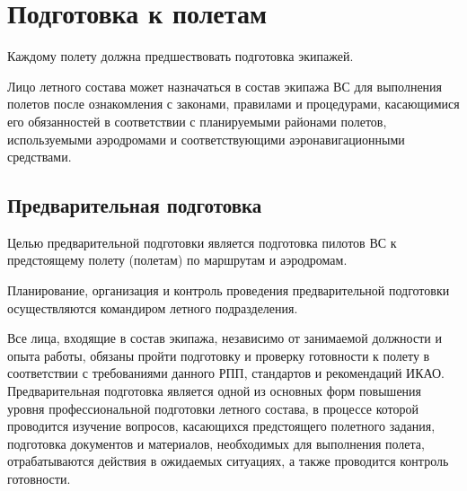 
\section{Подготовка к полетам}

Каждому полету должна предшествовать подготовка экипажей. 

Лицо летного состава может назначаться в состав экипажа ВС для выполнения полетов после ознакомления с законами, правилами и процедурами, касающимися его обязанностей в соответствии с планируемыми районами полетов, используемыми аэродромами и соответствующими аэронавигационными средствами.

\subsection{Предварительная подготовка}
\setcounter{subsect}{1}

Целью предварительной подготовки является подготовка пилотов ВС к предстоящему полету (полетам) по маршрутам и аэродромам. 

Планирование, организация и контроль проведения предварительной подготовки осуществляются командиром летного подразделения.

Все лица, входящие в состав экипажа, независимо от занимаемой должности и опыта работы, обязаны пройти подготовку и проверку готовности к полету в соответствии с требованиями данного РПП, стандартов и рекомендаций ИКАО.
Предварительная подготовка является одной из основных форм повышения уровня профессиональной подготовки летного состава, в процессе которой проводится изучение вопросов, касающихся предстоящего полетного задания, подготовка документов и материалов, необходимых для выполнения полета, отрабатываются действия в ожидаемых ситуациях, а также проводится контроль готовности.

